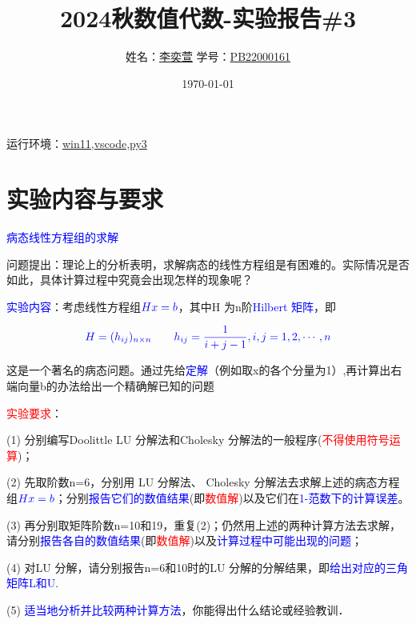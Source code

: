 \documentclass[12pt]{article}
\begin{document}
\title{\huge{\textbf{2024秋数值代数-实验报告\#3}}}
\author{姓名：\underline{李奕萱} \hspace{1cm}学号：\underline{PB22000161} }
\date{\today}

\maketitle

运行环境：\underline{win11,vscode,py3}

\section*{实验内容与要求}

\textcolor{blue}{病态线性方程组的求解}


问题提出：理论上的分析表明，求解病态的线性方程组是有困难的。实际情况是否如此，具体计算过程中究竟会出现怎样的现象呢？

\textcolor{blue}{实验内容}：考虑线性方程组$\textcolor{blue}{Hx = b}$，其中H 为n阶\textcolor{blue}{Hilbert 矩阵}，即

$$\textcolor{blue}{ H=(h_{ij})_{n\times n}\qquad  h_{ij}=\frac{1}{i+j-1},i,j=1,2,\cdots,n  }$$

这是一个著名的病态问题。通过先给\textcolor{blue}{定解}（例如取x的各个分量为1）,再计算出右端向量b的办法给出一个精确解已知的问题

\textcolor{red}{实验要求}：

(1) 分别编写Doolittle LU 分解法和Cholesky 分解法的一般程序(\textcolor{red}{不得使用符号运算})；

(2) 先取阶数n=6，分别用 LU 分解法、 Cholesky 分解法去求解上述的病态方程组$\textcolor{blue}{Hx = b}$；分别\textcolor{blue}{报告它们的数值结果}(即\textcolor{red}{数值解})以及它们在\textcolor{blue}{1-范数下的计算误差}。

(3) 再分别取矩阵阶数n=10和19，重复(2)；仍然用上述的两种计算方法去求解，请分别\textcolor{blue}{报告各自的数值结果}(即\textcolor{red}{数值解})以及\textcolor{blue}{计算过程中可能出现的问题}；

(4) 对LU 分解，请分别报告n=6和10时的LU 分解的分解结果，即\textcolor{blue}{给出对应的三角矩阵L和U}.

(5) \textcolor{blue}{适当地分析并比较两种计算方法}，你能得出什么结论或经验教训．
\clearpage
\end{document}
